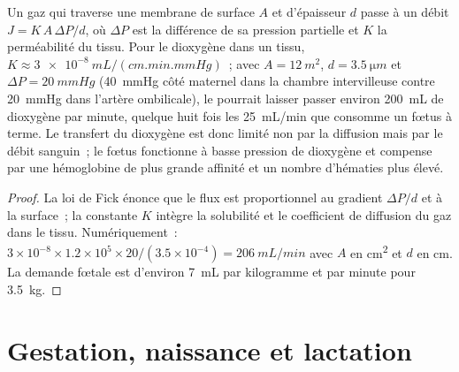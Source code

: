 \begin{theorem}\label{thm:b2:mammal-reproduction:fick}
Un gaz qui traverse une membrane de surface $A$ et d'épaisseur $d$ passe
à un débit $J = K\,A\,\Delta P/d$, où $\Delta P$ est la différence de
sa pression partielle et $K$ la perméabilité du tissu. Pour le dioxygène
dans un tissu, $K \approx \qty{3e-8}{mL/(cm.min.mmHg)}$~; avec $A =
\qty{12}{m^2}$, $d = \qty{3.5}{\micro m}$ et $\Delta P =
\qty{20}{mmHg}$ (\qty{40}{mmHg} côté maternel dans la chambre
intervilleuse contre \qty{20}{mmHg} dans l'artère ombilicale), le
 pourrait laisser passer environ \qty{200}{mL} de dioxygène par
minute, quelque huit fois les \qty{25}{mL/min} que consomme un fœtus à
terme. Le transfert du dioxygène est donc limité non par la diffusion
mais par le débit sanguin~; le fœtus fonctionne à basse pression de
dioxygène et compense par une hémoglobine de plus grande affinité et un
nombre d'hématies plus élevé.
\end{theorem}
\begin{proof}
La loi de Fick énonce que le flux est proportionnel au gradient
$\Delta P/d$ et à la surface~; la constante $K$ intègre la solubilité et
le coefficient de diffusion du gaz dans le tissu. Numériquement~:
$3\times 10^{-8}\times 1.2\times 10^{5}\times 20/(3.5\times 10^{-4})
= \qty{206}{mL/min}$ avec $A$ en \unit{cm^2} et $d$ en \unit{cm}.
La demande fœtale est d'environ \qty{7}{mL} par kilogramme et par
minute pour \qty{3.5}{kg}.
\end{proof}

\section{Gestation, naissance et lactation}

